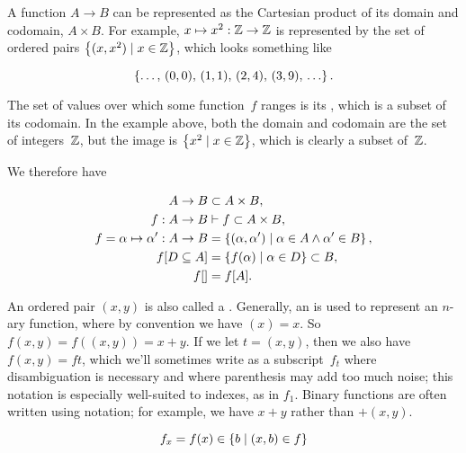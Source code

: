 \indexsym{}
A function $A\rightarrow B$ can be represented as the Cartesian
  product of its domain and codomain, $A\times B$.
For example,
  $x\mapsto x^2 : \mathbb{Z}\rightarrow\mathbb{Z}$ is represented by the set of ordered
  pairs $\left\{(x,x^2) \mid x\in\mathbb{Z}\right\}$, which looks something like

\begin{equation*}
  \left\{\ldots,\,(0,0),\,(1,1),\,(2,4),\,(3,9),\,\ldots\right\}.
\end{equation*}

The set of values over which some function~$f$ ranges is its ,
  which is a subset of its codomain.
In the example above,
  both the domain and codomain are the set of integers~$\mathbb{Z}$,
  but the image is $\left\{x^2 \mid x\in\mathbb{Z}\right\}$,
    which is clearly a subset of~$\mathbb{Z}$.

We therefore have

\begin{align}
  A \rightarrow B &\subset A\times B, \\
  f : A \rightarrow B &\vdash f \subset A\times B, \\
  f = \alpha \mapsto \alpha' : A \rightarrow B
                  &= \left\{(\alpha,\alpha')
                            \mid \alpha\in A \land \alpha'\in B\right\}, \\
  f[D\subseteq A] &= \left\{f(\alpha) \mid \alpha\in D\right\} \subset B, \\
  f[] &= f[A].
\end{align}

An ordered pair $(x,y)$ is also called a .
Generally,
  an  is used to represent an $n$-ary function,
    where by convention we have $(x)=x$.
So $f(x,y) = f((x,y)) = x+y$.
If we let $t=(x,y)$,
  then we also have $f(x,y) = ft$,
    which we'll sometimes write as a subscript~$f_t$ where disambiguation is
      necessary and where parenthesis may add too much noise;
        this notation is especially well-suited to indexes,
          as in $f_1$.
Binary functions are often written using  notation;
  for example, we have $x+y$ rather than $+(x,y)$.

\begin{equation}
  f_x = f(x) \in \left\{b \mid (x,b) \in f\right\}
\end{equation}


